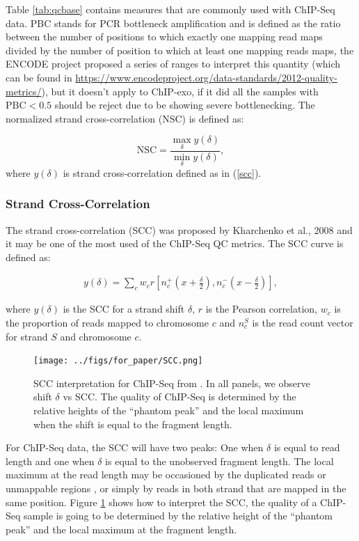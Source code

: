 \documentclass[11pt]{article}\usepackage[]{graphicx}\usepackage[]{color}
\begin{document}
Table \ref{tab:qcbase} contains measures that are commonly used with
ChIP-Seq data. PBC stands for PCR bottleneck amplification and is
defined as the ratio between the number of positions to which exactly
one mapping read maps divided by the number of position to which at
least one mapping reads maps, the ENCODE project proposed a series of
ranges to interpret this quantity (which can be found in
\url{https://www.encodeproject.org/data-standards/2012-quality-metrics/}),
but it doesn't apply to ChIP-exo, if it did all the samples with
$\mbox{PBC} < 0.5$ should be reject due to be showing severe
bottlenecking. The normalized strand cross-correlation (NSC) is
defined as:

\[
\mbox{NSC} = \frac{ \max_\delta y(\delta)}{\min_\delta y(\delta)},
\]
where $y(\delta)$ is strand cross-correlation defined as in (\ref{scc}). 

\subsubsection{Strand Cross-Correlation}
\label{sec:scc}

The strand cross-correlation (SCC) was proposed by Kharchenko et al.,
2008 \cite{strandcc} and it may be one of the most used of the
ChIP-Seq QC metrics. The SCC curve is defined as:

\begin{align}
  y(\delta) = \sum_c w_c r\left[ n_c^+ \left(x + \frac{\delta}{2}
    \right), n_c^- \left( x- \frac{\delta}{2} \right)\right],
\label{scc}
\end{align}

where $y(\delta)$ is the SCC for a strand shift $\delta$, $r$ is the
Pearson correlation, $w_c$ is the proportion of reads mapped to
chromosome $c$ and $n_c^S$ is the read count vector for strand $S$ and
chromosome $c$.

\begin{figure}[H]
  \centering
  \texttt{[image: ../figs/for\_paper/SCC.png]}
  \caption{SCC interpretation for ChIP-Seq from \cite{encode_qc}. In
    all panels, we observe shift $\delta$ vs SCC. The quality of
    ChIP-Seq is determined by the relative heights of the ``phantom
    peak'' and the local maximum when the shift is equal to the
    fragment length.}
  \label{fig:scc_landt}
\end{figure}

For ChIP-Seq data, the SCC will have two peaks: One when $\delta$ is
equal to read length and one when $\delta$ is equal to the unobserved
fragment length. The local maximum at the read length may be
occasioned by the duplicated reads or unmappable regions
\cite{carroll.qc}, or simply by reads in both strand that are mapped
in the same position. Figure \ref{fig:scc_landt} shows how to
interpret the SCC, the quality of a ChIP-Seq sample is going to be
determined by the relative height of the ``phantom peak'' and the
local maximum at the fragment length.
\end{document}
